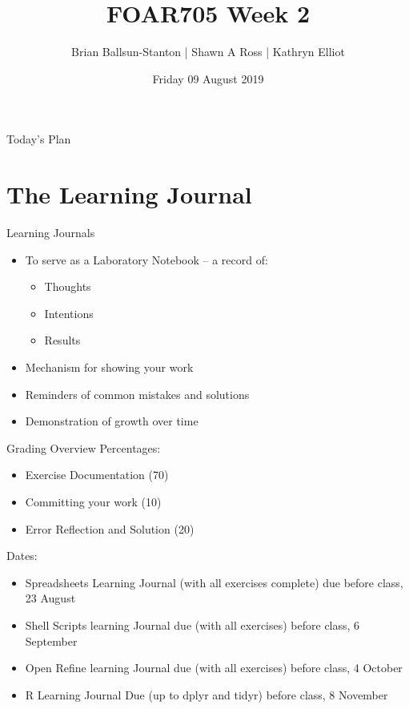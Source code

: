 \documentclass[aspectratio=43, 11pt]{beamer} %
\title{FOAR705 Week 2} %
\author{Brian Ballsun-Stanton | Shawn A Ross | Kathryn Elliot}               %
\institute{Faculty of Arts}         %
\date{Friday 09 August 2019}                 %
\begin{document}

\maketitle

  

\begin{frame}{Today's Plan}
  \tableofcontents
\end{frame}


\section{The Learning Journal}

\begin{frame}{Learning Journals}
\begin{itemize}[label=\textbullet]
    \item To serve as a Laboratory Notebook -- a record of:
    \begin{itemize}[label=\textbullet]
        \item Thoughts
        \item Intentions
        \item Results
    \end{itemize}
    \item Mechanism for showing your work
    \item Reminders of common mistakes and solutions
    \item Demonstration of growth over time
\end{itemize}    
\end{frame}

\begin{frame}{Grading Overview}
Percentages:
\begin{itemize}[label=\textbullet]
    \item Exercise Documentation (70)
    \item Committing your work (10)
    \item Error Reflection and Solution (20)
\end{itemize}    

Dates:
\begin{itemize}[label=\textbullet]
    \item Spreadsheets Learning Journal (with all exercises complete) due before class, 23 August

    \item Shell Scripts learning Journal due (with all exercises) before class, 6 September

    \item Open Refine learning Journal due (with all exercises) before class, 4 October
    \item R Learning Journal Due (up to dplyr and tidyr) before class, 8 November

\end{itemize}    

\end{frame}
\end{document}
